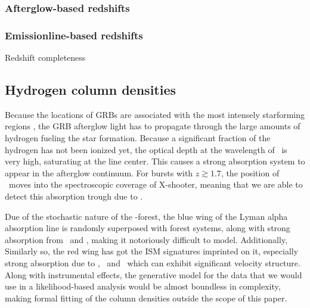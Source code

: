 \documentclass{aa}    %
\begin{document}
\subsubsection{Afterglow-based redshifts}

\subsubsection{Emissionline-based redshifts}	

Redshift completeness


\subsection{Hydrogen column densities}

Because the locations of GRBs are associated with the most intensely starforming
regions \citep{Hogg1999, Bloom2002, Fruchter2006}, the GRB afterglow light has
to propagate through the large amounts of hydrogen fueling the star formation.
Because a significant fraction of the hydrogen has not been ionized yet, the
optical depth at the wavelength of \lya~is very high, saturating at the line
center. This causes a strong absorption system to appear in the afterglow
continuum. For bursts with $z \gtrsim 1.7$, the position of \lya~moves into the
spectroscopic coverage of X-shooter, meaning that we are able to detect this
absorption trough due to \lya.

Due of the stochastic nature of the \lya-forest, the blue wing of the Lyman
alpha absorption line is randomly superposed with forest systems, along with
strong absorption from \mnii~and \SIiii, making it notoriously difficult to
model. Additionally, Similarly so, the red wing has got the ISM signatures
imprinted on it, especially strong absorption due to \SIii, \sii~and \nv~which
can exhibit significant velocity structure. Along with instrumental effects, the
generative model for the data that we would use in a likelihood-based analysis
would be almost boundless in complexity, making formal fitting of the column
densities outside the scope of this paper.
\end{document}
